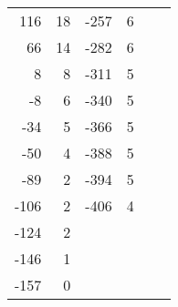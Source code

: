 \begin{table}[h!]
\begin{tabular}{rrrrrr}
   116 &      18 &   -257 &       6 &        &         \\
    66 &      14 &   -282 &       6 &        &         \\
     8 &       8 &   -311 &       5 &        &         \\
    -8 &       6 &   -340 &       5 &        &         \\
   -34 &       5 &   -366 &       5 &        &         \\
   -50 &       4 &   -388 &       5 &        &         \\
   -89 &       2 &   -394 &       5 &        &         \\
  -106 &       2 &   -406 &       4 &        &         \\
  -124 &       2 &        &         &        &         \\
  -146 &       1 &        &         &        &         \\
  -157 &       0 &        &         &        &         \\
\bottomrule
\end{tabular}
\label{tab:2}
\end{table}